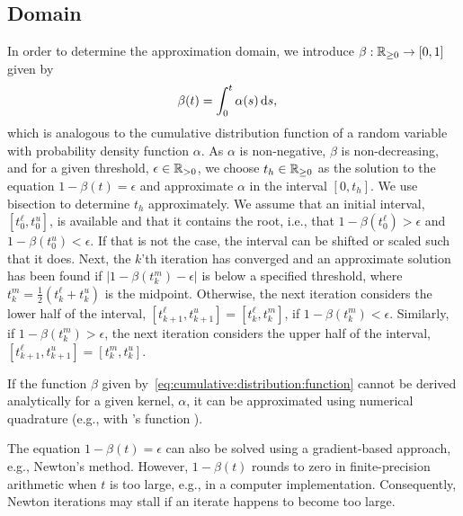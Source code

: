 \subsection{Domain}\label{sec:algo:domain}
In order to determine the approximation domain, we introduce $\beta: \mathbb{R}_{\geq 0} \rightarrow [0, 1]$ given by
%
\begin{align}\label{eq:cumulative:distribution:function}
	\beta(t) &= \int_0^t \alpha(s) \,\mathrm{d} s,
\end{align}
%
which is analogous to the cumulative distribution function of a random variable with probability density function $\alpha$. As $\alpha$ is non-negative, $\beta$ is non-decreasing, and for a given threshold, $\epsilon \in \mathbb{R}_{> 0}$, we choose $t_h \in \mathbb{R}_{\geq 0}$ as the solution to the equation $1 - \beta(t) = \epsilon$ and approximate $\alpha$ in the interval $[0, t_h]$.
%
We use bisection to determine $t_h$ approximately.
%
We assume that an initial interval, $[t_0^\ell, t_0^u]$, is available and that it contains the root, i.e., that $1 - \beta(t_0^\ell) > \epsilon$ and $1 - \beta(t_0^u) < \epsilon$. If that is not the case, the interval can be shifted or scaled such that it does. Next, the $k$'th iteration has converged and an approximate solution has been found if $|1 - \beta(t_k^m) - \epsilon|$ is below a specified threshold, where $t_k^m = \frac{1}{2}(t_k^\ell + t_k^u)$ is the midpoint. Otherwise, the next iteration considers the lower half of the interval, $[t_{k+1}^\ell, t_{k+1}^u] = [t_k^\ell, t_k^m]$, if $1 - \beta(t_k^m) < \epsilon$. Similarly, if $1 - \beta(t_k^m) > \epsilon$, the next iteration considers the upper half of the interval, $[t_{k+1}^\ell, t_{k+1}^u] = [t_k^m, t_k^u]$.
%
\begin{remark}
	If the function $\beta$ given by~\eqref{eq:cumulative:distribution:function} cannot be derived analytically for a given kernel, $\alpha$, it can be approximated using numerical quadrature (e.g., with \matlab{}'s function \integral{}).
\end{remark}
%
\begin{remark}
	The equation $1 - \beta(t) = \epsilon$ can also be solved using a gradient-based approach, e.g., Newton's method. However, $1 - \beta(t)$ rounds to zero in finite-precision arithmetic when $t$ is too large, e.g., in a computer implementation. Consequently, Newton iterations may stall if an iterate happens to become too large.
\end{remark}

